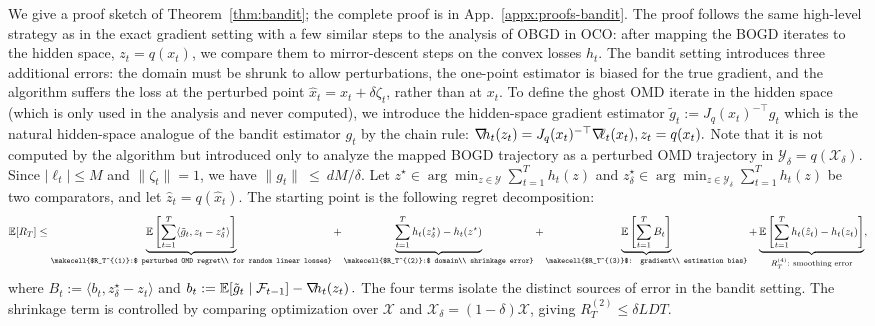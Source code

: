 \documentclass[a4paper,11pt,fullpage]{article}
\def\X{{\mathcal X}}
\def\Y{{\mathcal Y}}
\theoremstyle{plain}
\theoremstyle{definition}
\theoremstyle{plain}
\renewcommand{\leq}{~\le~}
\let\nablaold\nabla
\renewcommand{\nabla}{\nablaold\mkern-2.5mu}
\begin{document}
We give a proof sketch of Theorem~\ref{thm:bandit}; the complete proof is in
App.~\ref{appx:proofs-bandit}. The proof follows the same high-level strategy as in the exact gradient setting with a few similar steps to the analysis of OBGD in OCO: after mapping the BOGD iterates to the hidden
space, $z_t=q(x_t)$, we compare them to mirror-descent steps on the convex losses
$h_t$. The bandit setting introduces three additional errors: the domain must be
shrunk to allow perturbations, the one-point estimator is biased for the true
gradient, and the algorithm suffers the loss at the perturbed point
$\hat x_t=x_t+\delta\zeta_t$, rather than at $x_t$. To define the ghost OMD iterate in the hidden space (which is only used in the analysis and never computed), we introduce the hidden-space gradient estimator $\tilde g_t := J_q(x_t)^{-\top} g_t$ which is the natural hidden-space analogue of the bandit estimator $g_t$ by the chain rule: $\nabla h_t(z_t)=J_q(x_t)^{-\top}\nabla \ell_t(x_t), z_t=q(x_t).$
Note that it is not computed by the algorithm but introduced only to analyze the mapped BOGD trajectory as a perturbed OMD trajectory in $\Y_\delta=q(\X_\delta)$. Since \(|\ell_t|\le M\) and \(\|\zeta_t\|=1\), we have $\|g_t\| \leq dM/\delta$. 
Let $z^\star\in\arg\min_{z\in\Y}\sum_{t=1}^T h_t(z)$ and $z^\star_\delta\in\arg\min_{z\in\Y_\delta}\sum_{t=1}^T h_t(z)$ be two comparators, and let \(\hat z_t=q(\hat x_t)\). 
The starting point is the following regret decomposition:
\begin{multline*}
\mathbb{E}[R_T]
\le
\underbrace{
\mathbb{E}\left[\sum_{t=1}^T
\langle \tilde g_t,z_t-z^\star_\delta\rangle\right]
}_{\text{\makecell{$R_T^{(1)}:$ perturbed OMD regret\\ for random linear losses}}}
+
\underbrace{
\sum_{t=1}^T h_t(z^\star_\delta)-h_t(z^\star)
}_{\text{\makecell{$R_T^{(2)}:$ domain\\ shrinkage error}}}
+
\underbrace{
\mathbb{E}\left[\sum_{t=1}^T
B_t\right]
}_{\text{\makecell{$R_T^{(3)}$: gradient\\ estimation bias}}}
+
\underbrace{
\mathbb{E}\left[\sum_{t=1}^T h_t(\hat z_t)-h_t(z_t)\right]
}_{R_T^{(4)}:\ \text{smoothing error}},
\end{multline*}
where $B_t := \langle b_t,z^\star_\delta-z_t\rangle$ and $b_t:=\mathbb{E}[\tilde g_t\mid\mathcal F_{t-1}]-\nabla h_t(z_t)\,.$ 
The four terms isolate the distinct sources of error in the bandit setting. The shrinkage term is controlled by comparing optimization over $\X$ and
$\X_\delta=(1-\delta)\X$, giving $R_T^{(2)}\le \delta LDT$. 
\end{document}
